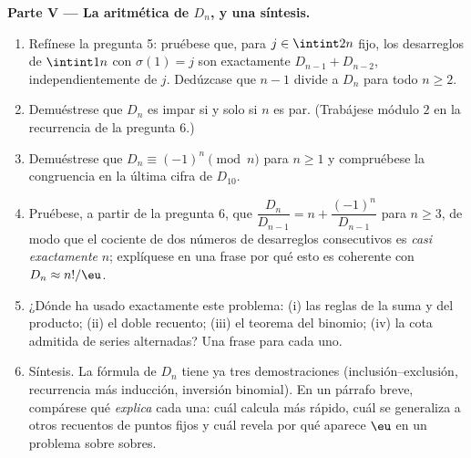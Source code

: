 \begin{problem}
\medskip
\noindent\textbf{Parte V --- La aritmética de $D_n$, y una
síntesis.}
\begin{enumerate}[resume]
  \item Refínese la pregunta 5: pruébese que, para $j \in \intint2n$
        fijo, los desarreglos de $\intint1n$ con $\sigma(1) = j$ son
        exactamente $D_{n-1} + D_{n-2}$, independientemente de $j$.
        Dedúzcase que $n - 1$ divide a $D_n$ para todo $n \geq 2$.
  \item Demuéstrese que $D_n$ es impar si y solo si $n$ es par.
        (Trabájese módulo $2$ en la recurrencia de la pregunta 6.)
  \item Demuéstrese que $D_n \equiv (-1)^n \pmod n$ para $n \geq 1$ y
        compruébese la congruencia en la última cifra de $D_{10}$.
  \item Pruébese, a partir de la pregunta 6, que
        $\dfrac{D_n}{D_{n-1}} = n + \dfrac{(-1)^n}{D_{n-1}}$ para
        $n \geq 3$, de modo que el cociente de dos números de
        desarreglos consecutivos es \emph{casi exactamente} $n$;
        explíquese en una frase por qué esto es coherente con
        $D_n \approx n!/\eu$.
  \item ¿Dónde ha usado exactamente este problema: (i) las reglas de la
        suma y del producto; (ii) el doble recuento; (iii) el teorema
        del binomio; (iv) la cota admitida de series alternadas? Una
        frase para cada uno.
  \item Síntesis. La fórmula de $D_n$ tiene ya tres demostraciones
        (inclusión--exclusión, recurrencia más inducción, inversión
        binomial). En un párrafo breve, compárese qué \emph{explica}
        cada una: cuál calcula más rápido, cuál se generaliza a otros
        recuentos de puntos fijos y cuál revela por qué aparece $\eu$
        en un problema sobre sobres.
\end{enumerate}
\end{problem}
